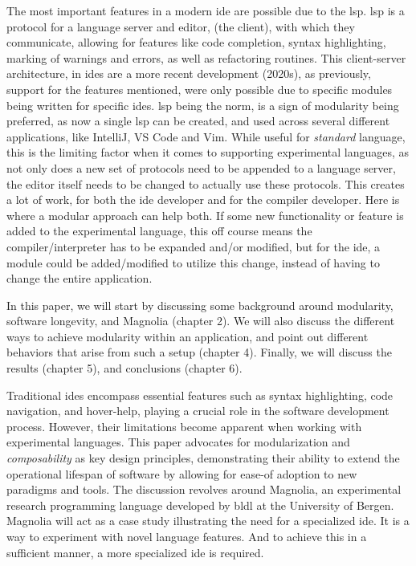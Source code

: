 The most important features in a modern \gls{ide} are possible due to the
\gls{lsp}. \gls{lsp} is a protocol for a language server and editor,
(the client), with which they communicate, allowing for features like code
completion, syntax highlighting, marking of warnings and errors, as well as
refactoring routines. This client-server architecture, in \gls{ide}s are a
more recent development (2020s), as previously, support for the features
mentioned, were only possible due to specific modules being written for
specific \gls{ide}s. \gls{lsp} being the norm, is a sign of modularity being
preferred, as now a single \gls{lsp} can be created, and used across several
different applications, like IntelliJ, VS Code and Vim. While useful for
\textit{standard} language, this is the limiting factor when it comes to
supporting experimental languages, as not only does a new set of protocols need
to be appended to a language server, the editor itself needs to be changed to
actually use these protocols. This creates a lot of work, for both the \gls{ide}
developer and for the compiler developer. Here is where a modular approach can
help both. If some new functionality or feature is added to the experimental
language, this off course means the compiler/interpreter has to be expanded
and/or modified, but for the \gls{ide}, a module could be added/modified to
utilize this change, instead of having to change the entire application.

In this paper, we will start by discussing some background around modularity,
software longevity, and Magnolia (chapter 2). We will also discuss the different
ways to achieve modularity within an application, and point out different
behaviors that arise from such a setup (chapter 4). Finally, we will discuss the
results (chapter 5), and conclusions (chapter 6).

Traditional \gls{ide}s encompass essential features such as syntax highlighting, code
navigation, and hover-help, playing a crucial role in the software development
process. However, their limitations become apparent when working with
experimental languages. This paper advocates for modularization and
\textit{composability} as key design principles, demonstrating their ability to
extend the operational lifespan of software by allowing for ease-of adoption to
new paradigms and tools. The discussion revolves around Magnolia, an
experimental research programming language developed by \gls{bldl} at the
University of Bergen. Magnolia will act as a case study illustrating the need for
a specialized \gls{ide}. It is a way to experiment with novel language features.
And to achieve this in a sufficient manner, a more specialized \gls{ide} is
required.


